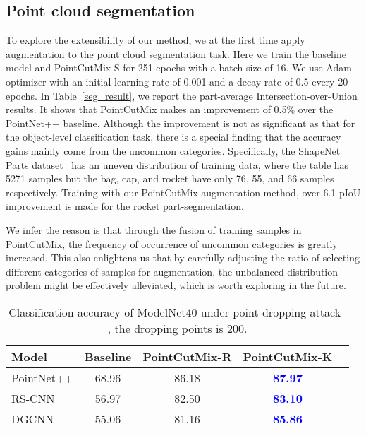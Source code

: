 \documentclass{article}
\begin{document}
\subsection{Point cloud segmentation}
To explore the extensibility of our method, we at the first time apply augmentation to the point cloud segmentation task. Here we train the baseline model and PointCutMix-S for 251 epochs with a batch size of 16. We use Adam~\cite{kingma2014adam} optimizer with an initial learning rate of 0.001 and a decay rate of 0.5 every 20 epochs. In Table~\ref{seg_result}, we report the part-average Intersection-over-Union results. It shows that PointCutMix makes an improvement of 0.5\% over the PointNet++ baseline. Although the improvement is not as significant as that for the object-level classification task, there is a special finding that the accuracy gains mainly come from the uncommon categories. Specifically, the ShapeNet Parts dataset~\cite{shapepartseg} has an uneven distribution of training data, where the table has 5271 samples but the bag, cap, and rocket have only 76, 55, and 66 samples respectively. Training with our PointCutMix augmentation method, over 6.1 pIoU improvement is made for the rocket part-segmentation.

We infer the reason is that through the fusion of training samples in PointCutMix, the frequency of occurrence of uncommon categories is greatly increased. This also enlightens us that by carefully adjusting the ratio of selecting different categories of samples for augmentation, the unbalanced distribution problem might be effectively alleviated, which is worth exploring in the future.


\begin{table}[t]
\centering
\setlength\tabcolsep{3pt}
\caption{Classification accuracy of ModelNet40 under point dropping attack~\cite{pointcloudsaliencymaps} , the dropping points is 200.}
\label{attackresult}
\vspace{2mm}
\begin{tabular}{l c c c c}
\toprule
Model & Baseline  & PointCutMix-R & PointCutMix-K \\
\midrule
PointNet++ & 68.96 & 86.18 & \textcolor{blue}{\textbf{87.97}} 
\\
RS-CNN &56.97 &82.50 & \textcolor{blue}{\textbf{83.10}}
\\
DGCNN &55.06  & 81.16  & \textcolor{blue}{\textbf{85.86}}
\\
\bottomrule
\end{tabular}
\end{table}
\end{document}
